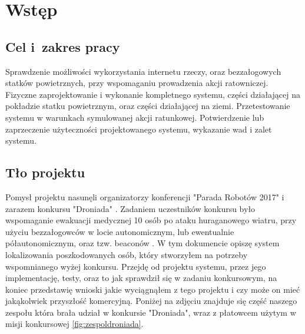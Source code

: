 \section{Wstęp}
\suppressfloats[t]  %
\subsection{Cel i~zakres pracy}

Sprawdzenie możliwości wykorzystania internetu rzeczy, oraz bezzałogowych statków powietrznych, przy wspomaganiu prowadzenia akcji ratowniczej. Fizyczne zaprojektowanie i wykonanie kompletnego systemu, części działającej na pokładzie statku powietrznym, oraz części działającej na ziemi. Przetestowanie systemu w warunkach symulowanej akcji ratunkowej. Potwierdzenie lub zaprzeczenie użyteczności projektowanego systemu, wykazanie wad i zalet systemu.

\subsection{Tło projektu}

Pomysł projektu nasunęli organizatorzy konferencji "Parada Robotów 2017" i zarazem konkursu "Droniada" \cite{droniada}. Zadaniem uczestników konkursu było wspomaganie ewakuacji medycznej 10 osób po ataku huraganowego wiatru, przy użyciu bezzałogowców w locie autonomicznym, lub ewentualnie półautonomicznym, oraz tzw. beaconów \cite{beacon}. W tym dokumencie opiszę system lokalizowania poszkodowanych osób, który stworzyłem na potrzeby wspomnianego wyżej konkursu. Przejdę od projektu systemu, przez jego implementację, testy, oraz to jak sprawdził się w zadaniu konkursowym, na koniec przedstawię wnioski jakie wyciągnąłem z tego projektu i czy może on mieć jakąkolwiek przyszłość komercyjną. Poniżej na zdjęciu znajduje się część naszego zespołu która brała udział w konkursie "Droniada", wraz z płatowcem użytym w misji konkursowej \ref{fig:zespoldroniada}.

